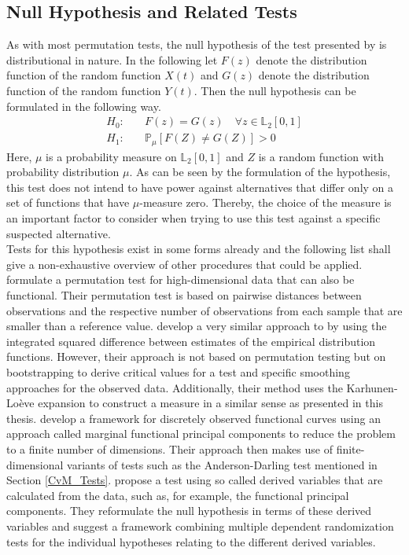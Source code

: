 \documentclass[12pt, a4paper]{article}
\theoremstyle{MAstyle} \newtheorem{assumption}{Assumption}[section]
\theoremstyle{MAstyle} \newtheorem{definition}{Definition}[section]
\theoremstyle{MAstyle} \newtheorem{theorem}{Theorem}[section]
\begin{document}
		\subsection{Null Hypothesis and Related Tests}
			As with most permutation tests, the null hypothesis of the test presented by \cite{bugni_permutation_2021} is distributional in nature. In the following let $F(z)$ denote the distribution function of the random function $X(t)$ and $G(z)$ denote the distribution function of the random function $Y(t)$. Then the null hypothesis can be formulated in the following way.
			\begin{equation}
				\begin{split}
					H_0: \quad &F(z) = G(z) \quad \forall z \in \mathbb{L}_2[0,1] \\
					H_1: \quad &\mathbb{P}_{\mu}\left[F(Z) \neq G(Z)\right] > 0
				\end{split}
			\end{equation}
			Here, $\mu$ is a probability measure on $\mathbb{L}_2[0,1]$ and $Z$ is a random function with probability distribution $\mu$. As can be seen by the formulation of the hypothesis, this test does not intend to have power against alternatives that differ only on a set of functions that have $\mu$-measure zero. Thereby, the choice of the measure is an important factor to consider when trying to use this test against a specific suspected alternative. \\
			
			Tests for this hypothesis exist in some forms already and the following list shall give a non-exhaustive overview of other procedures that could be applied. \cite{hall_permutation_2002} formulate a permutation test for high-dimensional data that can also be functional. Their permutation test is based on pairwise distances between observations and the respective number of observations from each sample that are smaller than a reference value. 			
			\cite{hall_two-sample_2007} develop a very similar approach to \cite{bugni_permutation_2021}by using the integrated squared difference between estimates of the empirical distribution functions. However, their approach is not based on permutation testing but on bootstrapping to derive critical values for a test and specific smoothing approaches for the observed data. Additionally, their method uses the Karhunen-Lo\`{e}ve expansion to construct a measure in a similar sense as presented in this thesis.
			\cite{pomann_two-sample_2016} develop a framework for discretely observed functional curves using an approach called marginal functional principal components to reduce the problem to a finite number of dimensions. Their approach then makes use of finite-dimensional variants of tests such as the Anderson-Darling test mentioned in Section \ref{CvM_Tests}.
			\cite{corain_new_2014} propose a test using so called derived variables that are calculated from the data, such as, for example, the functional principal components. They reformulate the null hypothesis in terms of these derived variables and suggest a framework combining multiple dependent randomization tests for the individual hypotheses relating to the different derived variables.
		
\end{document}
